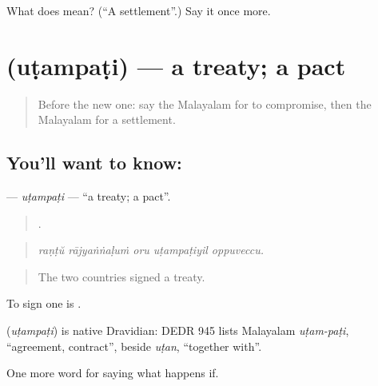 \begin{tcolorbox}[breakable,colback=teal!4,colframe=teal!35!black,title={Before you move on}]
What does  mean? (\textquotedblleft{}A settlement\textquotedblright{}.) Say it once more.
\end{tcolorbox}
\section[\texorpdfstring{\ml{ഉടമ്പടി} (uṭampaṭi)}{ഉടമ്പടി (uṭampaṭi)}]{ (uṭampaṭi) — a treaty; a pact}

\label{lesson:ML-C452-utampati}



\begin{quote}
Before the new one: say the Malayalam for to compromise, then the Malayalam for a settlement.
\end{quote}

\subsection*{You'll want to know: }
\textbf{} — \emph{uṭampaṭi} — \textquotedblleft{}a treaty; a pact\textquotedblright{}.

\begin{quote}
    .
\end{quote}

\begin{quote}
\emph{raṇṭŭ rājyaṅṅaḷuṁ oru uṭampaṭiyil oppuveccu.}
\end{quote}

\begin{quote}
The two countries signed a treaty.
\end{quote}

To sign one is  .

\begin{cousinweb}
\textbf{} (\emph{uṭampaṭi}) is native Dravidian: DEDR 945 lists Malayalam \emph{uṭam-paṭi}, \textquotedblleft{}agreement, contract\textquotedblright{}, beside \emph{uṭan}, \textquotedblleft{}together with\textquotedblright{}.
\end{cousinweb}

\begin{grammarlens}[title={What you've built}]
One more word for saying what happens if.
\end{grammarlens}


